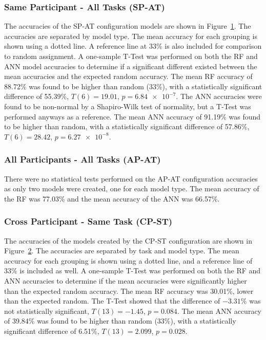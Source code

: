 \documentclass[11pt]{article}
\begin{document}
		\subsubsection{Same Participant - All Tasks (SP-AT)}
		The accuracies of the SP-AT configuration models are shown in Figure~\ref{fig:sp-at}. The accuracies are separated by model type. The mean accuracy for each grouping is shown using a dotted line. A reference line at 33\% is also included for comparison to random assignment. A one-sample T-Test was performed on both the RF and ANN model accuracies to determine if a significant different existed between the mean accuracies and the expected random accuracy. The mean RF accuracy of 88.72\% was found to be higher than random (33\%), with a statistically significant difference of 55.39\%, \(T(6) = 19.01\), \(p = \num{6.84e-7}\). The ANN accuracies were found to be non-normal by a Shapiro-Wilk test of normality, but a T-Test was performed anyways as a reference. The mean ANN accuracy of 91.19\% was found to be higher than random, with a statistically significant difference of 57.86\%, \(T(6) = 28.42\), \(p = \num{6.27e-8}\).
		\begin{figure}
		\centering
		\caption{}
		\label{fig:sp-at}
		\end{figure} 
		
		\subsubsection{All Participants - All Tasks (AP-AT)}
		There were no statistical tests performed on the AP-AT configuration accuracies as only two models were created, one for each model type. The mean accuracy of the RF was 77.03\% and the mean accuracy of the ANN was 66.57\%.
		
		\subsubsection{Cross Participant - Same Task (CP-ST)}
		The accuracies of the models created by the CP-ST configuration are shown in Figure~\ref{fig:cp-st}. The accuracies are separated by task and model type. The mean accuracy for each grouping is shown using a dotted line, and a reference line of 33\% is included as well. A one-sample T-Test was performed on both the RF and ANN accuracies to determine if the mean accuracies were significantly higher than the expected random accuracy. The mean RF accuracy was 30.01\%, lower than the expected random. The T-Test showed that the difference of \(-3.31\%\) was not statistically significant, \(T(13) = -1.45\), \(p = 0.084\). The mean ANN accuracy of 39.84\% was found to be higher than random (33\%), with a statistically significant difference of 6.51\%, \(T(13) = 2.099\), \(p = 0.028\).
		\begin{figure}
		\centering
		\caption{}
		\label{fig:cp-st}
		\end{figure} 
		
\end{document}
